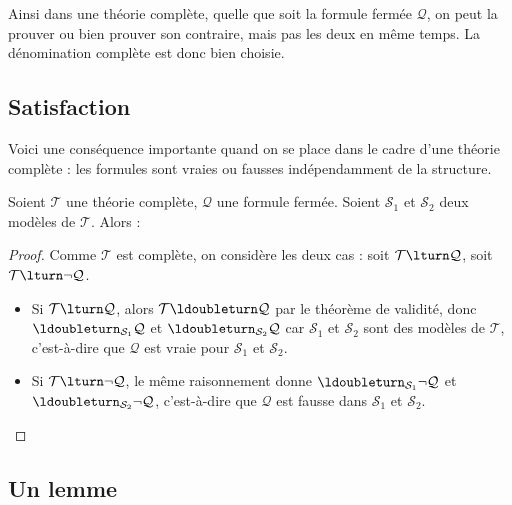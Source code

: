 \documentclass[11pt,class=report,crop=false]{standalone}
\begin{document}
Ainsi dans une théorie complète, quelle que soit la formule fermée $\mathcal{Q}$, on peut la prouver ou bien prouver son contraire, mais pas les deux en même temps. La dénomination \og{}complète\fg{} est donc bien choisie. 

\subsection{Satisfaction}

Voici une conséquence importante quand on se place dans le cadre d'une théorie complète : les formules sont vraies ou fausses indépendamment de la structure.

\begin{proposition}
	Soient $\mathcal{T}$ une théorie complète, $\mathcal{Q}$ une formule fermée. 
	Soient $\mathcal{S}_1$ et $\mathcal{S}_2$ deux modèles de $\mathcal{T}$. 
	Alors :
\end{proposition}

\begin{proof}
	Comme $\mathcal{T}$ est complète, on considère les deux cas : soit $\mathcal{T} \lturn \mathcal{Q}$, soit $\mathcal{T} \lturn \lnot \mathcal{Q}$.
	\begin{itemize}
		\item Si $\mathcal{T} \lturn \mathcal{Q}$, alors $\mathcal{T} \ldoubleturn \mathcal{Q}$ par le théorème de validité, donc $\ldoubleturn_{\mathcal{S}_1} \mathcal{Q}$ et $\ldoubleturn_{\mathcal{S}_2} \mathcal{Q}$ car $\mathcal{S}_1$ et $\mathcal{S}_2$ sont des modèles de $\mathcal{T}$, c'est-à-dire que $\mathcal{Q}$ est vraie pour $\mathcal{S}_1$ et $\mathcal{S}_2$.
		
		\item Si $\mathcal{T} \lturn \lnot \mathcal{Q}$, le même raisonnement donne $\ldoubleturn_{\mathcal{S}_1} \lnot \mathcal{Q}$ et $\ldoubleturn_{\mathcal{S}_2} \lnot \mathcal{Q}$, c'est-à-dire que $\mathcal{Q}$ est fausse dans $\mathcal{S}_1$ et $\mathcal{S}_2$.
	\end{itemize}
\end{proof}


\subsection{Un lemme}
\end{document}
